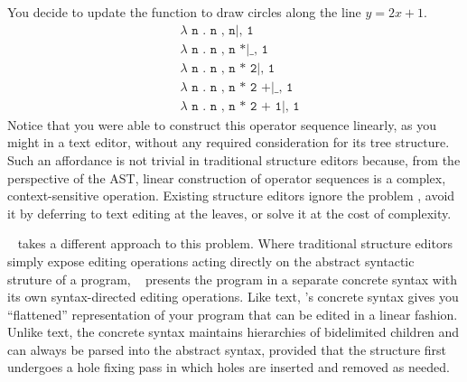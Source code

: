 You decide to update the function to draw circles along the
line $y = 2x + 1$.
\begin{align*}
  & \texttt{$\lambda$ n . n , n|, 1} \\
  & \texttt{$\lambda$ n . n , n *|\_ , 1} \\
  & \texttt{$\lambda$ n . n , n * 2|, 1} \\
  & \texttt{$\lambda$ n . n , n * 2 +|\_ , 1} \\
  & \texttt{$\lambda$ n . n , n * 2 + 1|, 1}
\end{align*}
Notice that you were able to construct this operator sequence
linearly, as you might in a text editor, without any
required consideration for its tree structure.
Such an affordance is not trivial
in traditional structure editors because,
from the perspective of the AST, linear construction of
operator sequences is a complex, context-sensitive operation.
Existing structure editors ignore the problem ,
avoid it by deferring to text editing at the leaves,
or solve it at the cost of complexity.

\tylr~ takes a different approach to this problem.
Where traditional structure editors simply expose editing
operations acting directly on the abstract syntactic struture
of a program, \tylr~ presents the program in a separate
concrete syntax with its own syntax-directed editing operations.
Like text, \tylr's concrete syntax gives you ``flattened''
representation of your program that can be edited in a linear fashion.
Unlike text, the concrete syntax maintains hierarchies of
bidelimited children and can always be parsed into
the abstract syntax, provided that the structure first undergoes
a hole fixing pass in which holes are inserted and removed
as needed.

